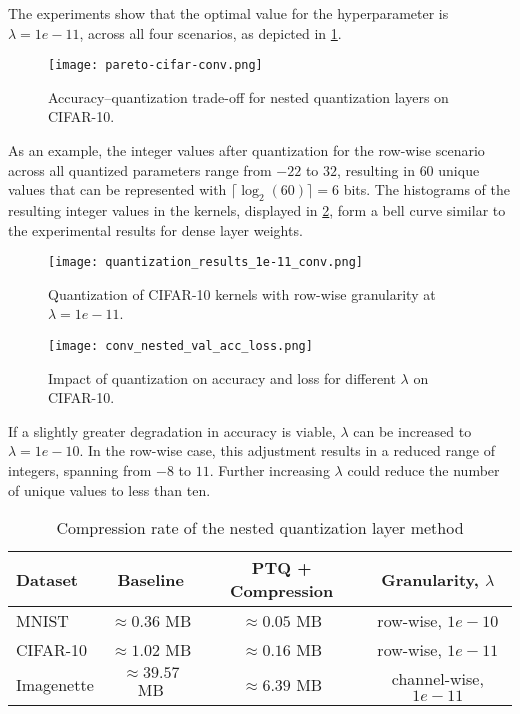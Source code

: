 The experiments show that the optimal value for the hyperparameter is \( \lambda = 1e-11\),
across all four scenarios, as depicted in \cref{fig:pareto-cifar-conv}.
\begin{figure}[b!]
  \centering
  \texttt{[image: pareto-cifar-conv.png]}
  \caption{Accuracy–quantization trade-off for nested quantization layers on CIFAR-10.}
  \label{fig:pareto-cifar-conv}
\end{figure}
As an example, the integer values after quantization for the row-wise scenario across
all quantized parameters range from \( -22 \) to \( 32 \), 
resulting in \( 60 \) unique values that can be represented with \( \lceil \log_2(60) \rceil = 6 \) bits.
The histograms of the resulting integer values in the kernels, displayed in \cref{fig:quantization-results-1e-10conv},
form a bell curve similar to the experimental results for dense layer weights.
\begin{figure}[t!]
  \centering
  \texttt{[image: quantization\_results\_1e-11\_conv.png]}
  \caption{Quantization of CIFAR-10 kernels with row-wise granularity at  \( \lambda  = 1e-11 \).}
  \label{fig:quantization-results-1e-10conv}
\end{figure}
\begin{figure}[t!]
  \centering
  \texttt{[image: conv\_nested\_val\_acc\_loss.png]}
  \caption{Impact of quantization on accuracy and loss for different \( \lambda \) on CIFAR-10.}
  \label{fig:val-accs-over-epochs-conv}
\end{figure}
If a slightly greater degradation in accuracy is viable, 
\( \lambda \) can be increased to \( \lambda = 1e-10\).
In the row-wise case, this adjustment results in a reduced range of integers,
spanning from \( -8 \) to \( 11 \). Further increasing \( \lambda \) could
reduce the number of unique values to less than ten.

\begin{table}[b!]
  \centering
  \caption{Compression rate of the nested quantization layer method}
  \label{tab:nestedcomrpessionrate}
  \begin{tabular}{lccc}
      \toprule
      \textbf{Dataset}     & \textbf{Baseline} & \textbf{PTQ + Compression} & \textbf{Granularity, $\lambda$} \\ 
      \midrule
      MNIST                & $\approx 0.36 $ MB            & $\approx 0.05 $ MB              & row-wise, $1e-10$         \\ 
      CIFAR-10          &  $\approx 1.02 $ MB          & $\approx 0.16 $ MB            & row-wise, $1e-11$            \\ 
      Imagenette               &  $\approx 39.57 $ MB          & $\approx 6.39 $ MB             & channel-wise, $1e-11$          \\ 

      \bottomrule
  \end{tabular}
  \vspace{0.5em}
\end{table}


